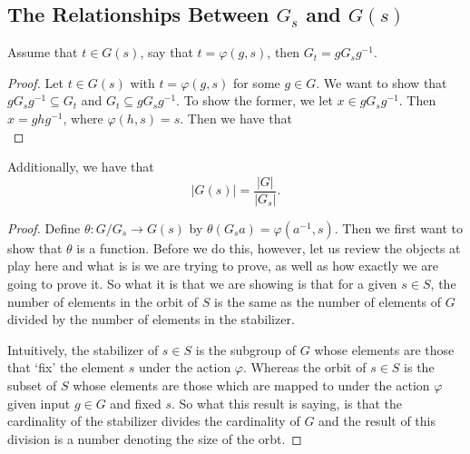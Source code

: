 \documentclass[12pt]{article}
\theoremstyle{definition}
\theoremstyle{definition}
\newcommand{\abs}[1]{\lvert #1 \rvert}
\begin{document}
    \subsection{The Relationships Between $G_s$ and $G(s)$}
      Assume that $t\in G(s)$, say that $t=\varphi(g, s)$, then
      $G_t=gG_sg^{-1}$. 
        \begin{proof}
          Let $t\in G(s)$ with $t=\varphi(g, s)$ for some $g\in G$. We want to
          show that $gG_sg^{-1}\subseteq G_t$ and $G_t\subseteq gG_sg^{-1}$. To
          show the former, we let $x\in gG_s g^{-1}$. Then $x=ghg^{-1}$, where
          $\varphi(h, s)=s$. Then we have that 
            \begin{equation*}
              
            \end{equation*}
        \end{proof}
      Additionally, we have that 
        \begin{equation*}
          \abs{G(s)}=\frac{\abs{G}}{\abs{G_s}}.
        \end{equation*}
        \begin{proof}
          Define $\theta:G/G_s\to G(s)$ by $\theta(G_sa)=\varphi(a^{-1}, s)$.
          Then we first want to show that $\theta$ is a function. Before we do
          this, however, let us review the objects at play here and what is is
          we are trying to prove, as well as how exactly we are going to prove
          it. So what it is that we are showing is that for a given $s\in S$,
          the number of elements in the orbit of $S$ is the same as the number
          of elements of $G$ divided by the number of elements in the
          stabilizer.\par\hspace{4mm} Intuitively, the stabilizer of $s\in S$ is the
          subgroup of $G$ whose elements are those that `fix' the element $s$
          under the action $\varphi$. Whereas the orbit of $s\in S$ is the
          subset of $S$ whose elements are those which are mapped to under the
          action $\varphi$ given input $g\in G$ and fixed $s$. So what this
          result is saying, is that the cardinality of the stabilizer divides
          the cardinality of $G$ and the result of this division is a number
          denoting the size of the orbt. \par\hspace{4mm}
        \end{proof}
\end{document}
